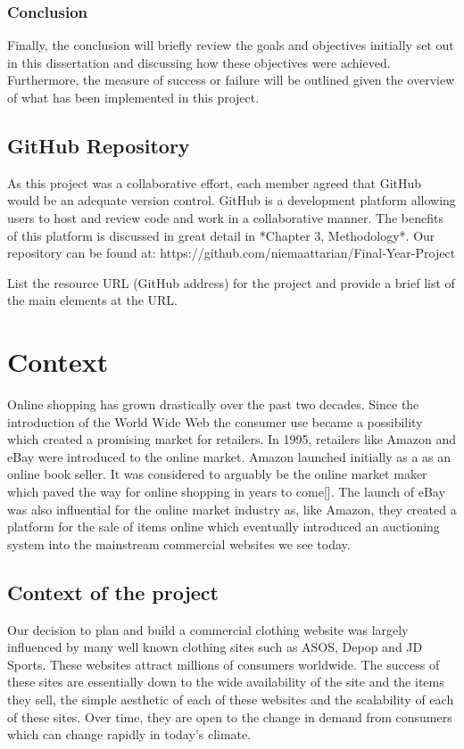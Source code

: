 \subsection{Conclusion}
Finally, the conclusion will briefly review the goals and objectives initially set out in this dissertation and discussing how these objectives were achieved. Furthermore, the measure of success or failure will be outlined given the overview of what has been implemented in this project.

\section{GitHub Repository}
As this project was a collaborative effort, each member agreed that GitHub would be an adequate version control. GitHub is a development platform allowing users to host and review code and work in a collaborative manner. The benefits of this platform is discussed in great detail in *Chapter 3, Methodology*. Our repository can be found at: https://github.com/niemaattarian/Final-Year-Project

List the resource URL (GitHub address) for the project and provide a brief list of the main elements at the URL.


\chapter{Context}

Online shopping has grown drastically over the past two decades. Since the introduction of the World Wide Web the consumer use became a possibility which created a promising market for retailers. In 1995, retailers like Amazon and eBay were introduced to the online market. Amazon launched initially as a as an online book seller. It was considered to arguably be the online market maker which paved the way for online shopping in years to come[]. The launch of eBay was also influential for the online market industry as, like Amazon, they created a platform for the sale of items online which eventually introduced an auctioning system into the mainstream commercial websites we see today.

\section{Context of the project}
Our decision to plan and build a commercial clothing website was largely influenced by many well known clothing sites such as ASOS, Depop and JD Sports. These websites attract millions of consumers worldwide. The success of these sites are essentially down to the wide availability of the site and the items they sell, the simple aesthetic of each of these websites and the scalability of each of these sites. Over time, they are open to the change in demand from consumers which can change rapidly in today's climate.
\newpage
